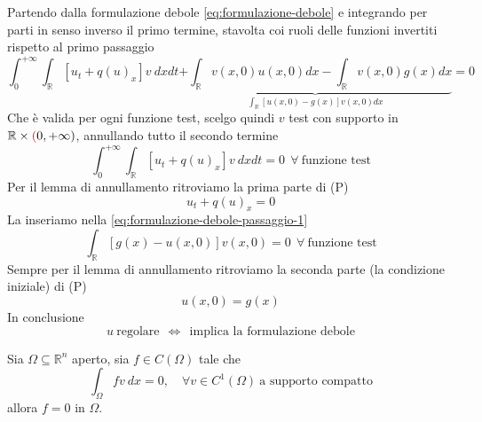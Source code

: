 \documentclass[10pt,a4paper,twoside,openright]{book}
\begin{document}
Partendo dalla formulazione debole \eqref{eq:formulazione-debole} e integrando per parti in senso inverso il primo termine, stavolta coi ruoli delle funzioni invertiti rispetto al primo passaggio
\begin{equation}
	\int ^{+\infty }_{0}\int _{\mathbb{R}}[ u_{t}+q( u)_{x}] v\ dxdt\underbrace{+\int _{\mathbb{R}} v( x,0) u( x,0) dx-\int _{\mathbb{R}} v( x,0) g( x) dx}_{\int _{\mathbb{R}}[ u( x,0)-g( x)] v( x,0) dx} =0
\label{eq:formulazione-debole-passaggio-1}
\end{equation}
Che è valida per ogni funzione test, scelgo quindi $v$ test con supporto in $\mathbb{R} \times \textcolor[rgb]{0.82,0.01,0.11}{(} 0,+\infty )$, annullando tutto il secondo termine
\begin{equation*}
	\int ^{+\infty }_{0}\int _{\mathbb{R}}[ u_{t} +q( u)_{x}] v\ dxdt=0\ \ \forall \ \text{funzione test}
\end{equation*}
Per il lemma di annullamento ritroviamo la prima parte di (P)
\begin{equation*}
	u_{t} +q( u)_{x} =0
\end{equation*}
La inseriamo nella \eqref{eq:formulazione-debole-passaggio-1}
\begin{equation*}
	\int _{\mathbb{R}}[ g( x) -u( x,0)] v( x,0) =0\ \ \forall \ \text{funzione test}
\end{equation*}
Sempre per il lemma di annullamento ritroviamo la seconda parte (la condizione iniziale) di (P)
\begin{equation*}
	u( x,0) =g( x)
\end{equation*}
In conclusione
\begin{equation}
	u\ \text{regolare} \ \ \Leftrightarrow \ \ \text{implica la formulazione debole}
\end{equation}
\begin{theorem}
	 Sia $\Omega \subseteq \mathbb{R}^{n}$ aperto, sia $f\in C( \Omega )$ tale che
	\begin{equation}
		\int _{\Omega } fv\ dx=0, \quad \forall  v\in C^{1}( \Omega ) \ \text{a supporto compatto}
	\end{equation}
	allora $f=0$ in $\Omega $.
\end{theorem}
\end{document}

